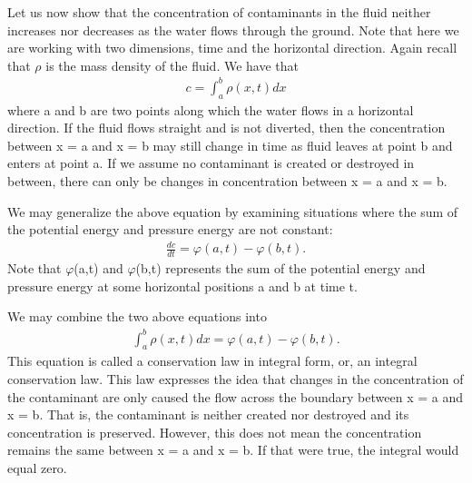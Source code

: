 \documentclass{article}
\begin{document}
Let us now show that the concentration of contaminants in the fluid neither increases nor decreases as the water flows through the ground. 
Note that here we are working with two dimensions, time and the horizontal direction. 
Again recall that $\rho$ is the mass density of the fluid. 
We have that 
    \begin{align}
        c = \int_{a}^{b} \rho (x,t) dx
    \end{align}
\noindent where a and b are two points along which the water flows in a horizontal direction. 
If the fluid flows straight and is not diverted, then the concentration between x = a and x = b may still change in time as fluid leaves at point b and enters at point a. 
If we assume no contaminant is created or destroyed in between, there can only be changes in concentration between x = a and x = b. 

We may generalize the above equation by examining situations where the sum of the potential energy and pressure energy are not constant:
    \begin{align}
        \frac{dc}{dt} = \varphi (a,t) - \varphi (b,t).
    \end{align}
\noindent Note that $\varphi$(a,t) and $\varphi$(b,t) represents the sum of the potential energy and pressure energy at some horizontal positions a and b at time t.

We may combine the two above equations into
    \begin{align}
        \int_{a}^{b} \rho (x,t) dx = \varphi (a,t) - \varphi (b,t).
    \end{align}
\noindent This equation is called a conservation law in integral form, or, an integral conservation law. 
This law expresses the idea that changes in the concentration of the contaminant are only caused the flow across the boundary between x = a and x = b.
That is, the contaminant is neither created nor destroyed and its concentration is preserved. 
However, this does not mean the concentration remains the same between x = a and x = b. 
If that were true, the integral would equal zero.
\end{document}
